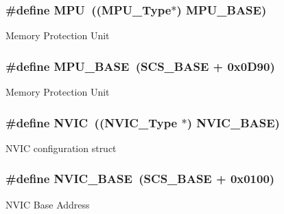 \subsubsection[{\texorpdfstring{M\+PU}{MPU}}]{\setlength{\rightskip}{0pt plus 5cm}\#define M\+PU~(({\bf M\+P\+U\+\_\+\+Type}$\ast$)            {\bf M\+P\+U\+\_\+\+B\+A\+SE})}\hypertarget{group__CMSIS__CM3__core__register_gaad8182e72fe5037a6ba1eb65a1554e0b}{}\label{group__CMSIS__CM3__core__register_gaad8182e72fe5037a6ba1eb65a1554e0b}
Memory Protection Unit 
\subsubsection[{\texorpdfstring{M\+P\+U\+\_\+\+B\+A\+SE}{MPU_BASE}}]{\setlength{\rightskip}{0pt plus 5cm}\#define M\+P\+U\+\_\+\+B\+A\+SE~({\bf S\+C\+S\+\_\+\+B\+A\+SE} +  0x0\+D90)}\hypertarget{group__CMSIS__CM3__core__register_gaa0805ccd2bc4e42d63adb0618d2af571}{}\label{group__CMSIS__CM3__core__register_gaa0805ccd2bc4e42d63adb0618d2af571}
Memory Protection Unit 
\subsubsection[{\texorpdfstring{N\+V\+IC}{NVIC}}]{\setlength{\rightskip}{0pt plus 5cm}\#define N\+V\+IC~(({\bf N\+V\+I\+C\+\_\+\+Type} $\ast$)          {\bf N\+V\+I\+C\+\_\+\+B\+A\+SE})}\hypertarget{group__CMSIS__CM3__core__register_gac8e97e8ce56ae9f57da1363a937f8a17}{}\label{group__CMSIS__CM3__core__register_gac8e97e8ce56ae9f57da1363a937f8a17}
N\+V\+IC configuration struct 
\subsubsection[{\texorpdfstring{N\+V\+I\+C\+\_\+\+B\+A\+SE}{NVIC_BASE}}]{\setlength{\rightskip}{0pt plus 5cm}\#define N\+V\+I\+C\+\_\+\+B\+A\+SE~({\bf S\+C\+S\+\_\+\+B\+A\+SE} +  0x0100)}\hypertarget{group__CMSIS__CM3__core__register_gaa0288691785a5f868238e0468b39523d}{}\label{group__CMSIS__CM3__core__register_gaa0288691785a5f868238e0468b39523d}
N\+V\+IC Base Address 
